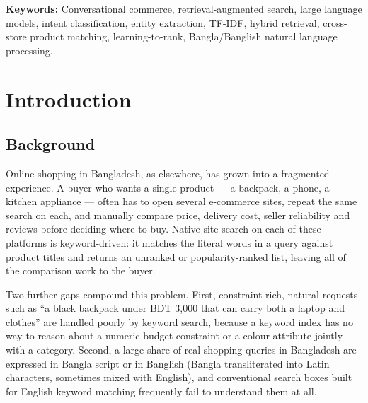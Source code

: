 \documentclass[12pt,a4paper]{report}
\begin{document}
\vspace{10pt}
\noindent\textbf{Keywords:} Conversational commerce, retrieval-augmented search, large language models,
intent classification, entity extraction, TF-IDF, hybrid retrieval, cross-store product matching,
learning-to-rank, Bangla/Banglish natural language processing.

\tableofcontents
\listoffigures
\listoftables

\cleardoublepage
{}

\chapter{Introduction}

\section{Background}
Online shopping in Bangladesh, as elsewhere, has grown into a fragmented experience. A buyer who wants a
single product --- a backpack, a phone, a kitchen appliance --- often has to open several e-commerce sites,
repeat the same search on each, and manually compare price, delivery cost, seller reliability and reviews
before deciding where to buy. Native site search on each of these platforms is keyword-driven: it matches
the literal words in a query against product titles and returns an unranked or popularity-ranked list,
leaving all of the comparison work to the buyer.

Two further gaps compound this problem. First, constraint-rich, natural requests such as ``a black
backpack under BDT 3,000 that can carry both a laptop and clothes'' are handled poorly by keyword search,
because a keyword index has no way to reason about a numeric budget constraint or a colour attribute
jointly with a category. Second, a large share of real shopping queries in Bangladesh are expressed in
Bangla script or in Banglish (Bangla transliterated into Latin characters, sometimes mixed with English),
and conventional search boxes built for English keyword matching frequently fail to understand them at
all.
\end{document}
